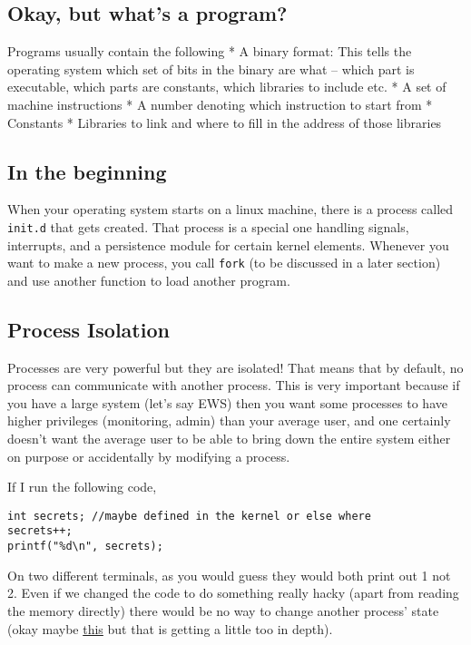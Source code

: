 \subsection{Okay, but what's a program?}\label{okay-but-whats-a-program}

Programs usually contain the following * A binary format: This tells the
operating system which set of bits in the binary are what -- which part
is executable, which parts are constants, which libraries to include
etc. * A set of machine instructions * A number denoting which
instruction to start from * Constants * Libraries to link and where to
fill in the address of those libraries

\subsection{In the beginning}\label{in-the-beginning}

When your operating system starts on a linux machine, there is a process
called \texttt{init.d} that gets created. That process is a special one
handling signals, interrupts, and a persistence module for certain
kernel elements. Whenever you want to make a new process, you call
\texttt{fork} (to be discussed in a later section) and use another
function to load another program.

\subsection{Process Isolation}\label{process-isolation}

Processes are very powerful but they are isolated! That means that by
default, no process can communicate with another process. This is very
important because if you have a large system (let's say EWS) then you
want some processes to have higher privileges (monitoring, admin) than
your average user, and one certainly doesn't want the average user to be
able to bring down the entire system either on purpose or accidentally
by modifying a process.

If I run the following code,

\begin{verbatim}
int secrets; //maybe defined in the kernel or else where
secrets++;
printf("%d\n", secrets);
\end{verbatim}

On two different terminals, as you would guess they would both print out
1 not 2. Even if we changed the code to do something really hacky (apart
from reading the memory directly) there would be no way to change
another process' state (okay maybe
\href{https://en.wikipedia.org/wiki/Dirty_COW}{this} but that is getting
a little too in depth).


